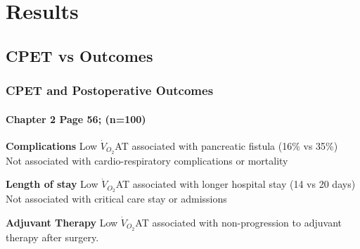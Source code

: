 \documentclass{beamer}
\begin{document}
\section{Results}

\subsection{CPET vs Outcomes}
\begin{frame}
	\frametitle{CPET and Postoperative Outcomes}
	\framesubtitle{Chapter 2 Page 56; (n=100)}
	\begin{block}{\textbf{Complications}}
		Low $\dot{V}_{O_2}$AT associated with pancreatic fistula (16\% vs 35\%) \\
		Not associated with cardio-respiratory complications or mortality
	\end{block}
	
	\begin{block}{\textbf{Length of stay}}
		Low $\dot{V}_{O_2}$AT associated with longer hospital stay (14 vs 20 days)\\
		Not associated with critical care stay or admissions
	\end{block}
	
	\begin{block}{\textbf{Adjuvant Therapy}}
		Low $\dot{V}_{O_2}$AT associated with non-progression to adjuvant therapy after surgery.
	\end{block}
\end{frame}
\end{document}
